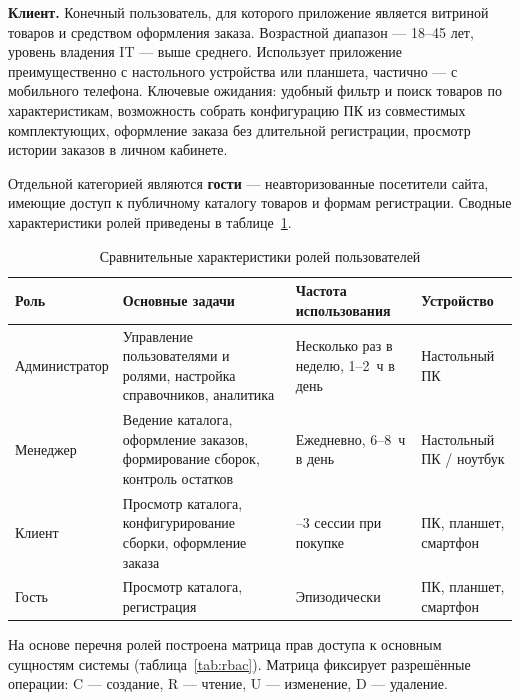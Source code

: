 \textbf{Клиент.} Конечный пользователь, для которого приложение является витриной товаров и средством оформления заказа. Возрастной диапазон --- 18--45 лет, уровень владения IT --- выше среднего. Использует приложение преимущественно с настольного устройства или планшета, частично --- с мобильного телефона. Ключевые ожидания: удобный фильтр и поиск товаров по характеристикам, возможность собрать конфигурацию ПК из совместимых комплектующих, оформление заказа без длительной регистрации, просмотр истории заказов в личном кабинете.

Отдельной категорией являются \textbf{гости} --- неавторизованные посетители сайта, имеющие доступ к публичному каталогу товаров и формам регистрации. Сводные характеристики ролей приведены в таблице~\ref{tab:roles}.

\begin{table}[ht!]
\caption{Сравнительные характеристики ролей пользователей}
\label{tab:roles}
\small
\begin{tabularx}{\textwidth}{|>{\RaggedRight\arraybackslash}p{}|>{\RaggedRight\arraybackslash}X|>{\RaggedRight\arraybackslash}p{}|>{\RaggedRight\arraybackslash}p{}|}
\hline
\textbf{Роль} & \textbf{Основные задачи} & \textbf{Частота использования} & \textbf{Устройство} \\ \hline
Администратор & Управление пользователями и ролями, настройка справочников, аналитика & Несколько раз в неделю, 1--2~ч в день & Настольный ПК \\ \hline
Менеджер & Ведение каталога, оформление заказов, формирование сборок, контроль остатков & Ежедневно, 6--8~ч в день & Настольный ПК / ноутбук \\ \hline
Клиент & Просмотр каталога, конфигурирование сборки, оформление заказа & 1--3 сессии при покупке & ПК, планшет, смартфон \\ \hline
Гость & Просмотр каталога, регистрация & Эпизодически & ПК, планшет, смартфон \\ \hline
\end{tabularx}
\end{table}

На основе перечня ролей построена матрица прав доступа к основным сущностям системы (таблица~\ref{tab:rbac}). Матрица фиксирует разрешённые операции: C --- создание, R --- чтение, U --- изменение, D --- удаление.

